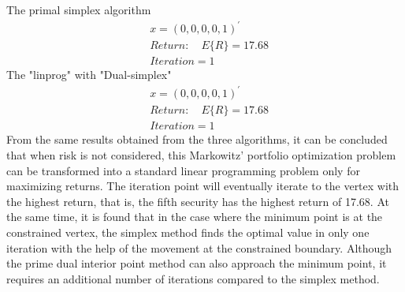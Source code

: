 The
primal simplex algorithm
\begin{align*}
&    x=(0,0,0,0,1)^{\prime}\\
&Return: \quad E\{ R\}=17.68\\
&Iteration=1
\end{align*}
The "linprog" with "Dual-simplex"
\begin{align*}
&    x=(0,0,0,0,1)^{\prime}\\
&Return: \quad E\{ R\}=17.68\\
&Iteration=1
\end{align*}
From the same results obtained from the three algorithms, it can be concluded that when risk is not considered, this Markowitz’ portfolio optimization problem can be transformed into a standard linear programming problem only for maximizing returns. The iteration point will eventually iterate to the vertex with the highest return, that is, the fifth security has the highest return of 17.68. At the same time, it is found that in the case where the minimum point is at the constrained vertex, the simplex method finds the optimal value in only one iteration with the help of the movement at the constrained boundary. Although the prime dual interior point method can also approach the minimum point, it requires an additional number of iterations compared to the simplex method.